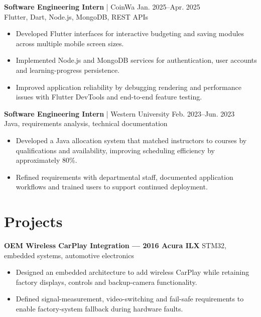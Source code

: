 \documentclass[letterpaper,10pt]{article}
\newcommand{\entry}[4]{
    \textbf{#1} \textnormal{| #2}
    \hfill {\small #3}\\[-1pt]
    {\small #4}
}
\begin{document}
\vspace{1pt}

\entry
{Software Engineering Intern}
{CoinWa}
{Jan. 2025--Apr. 2025}
{Flutter, Dart, Node.js, MongoDB, REST APIs}

\begin{itemize}
    \item Developed Flutter interfaces for interactive budgeting and saving modules across multiple mobile screen sizes.
    \item Implemented Node.js and MongoDB services for authentication, user accounts and learning-progress persistence.
    \item Improved application reliability by debugging rendering and performance issues with Flutter DevTools and end-to-end feature testing.
\end{itemize}

\vspace{1pt}

\entry
{Software Engineering Intern}
{Western University}
{Feb. 2023--Jun. 2023}
{Java, requirements analysis, technical documentation}

\begin{itemize}
    \item Developed a Java allocation system that matched instructors to courses by qualifications and availability, improving scheduling efficiency by approximately 80\%.
    \item Refined requirements with departmental staff, documented application workflows and trained users to support continued deployment.
\end{itemize}

\section{Projects}

\textbf{OEM Wireless CarPlay Integration --- 2016 Acura ILX}
\hfill
{\small STM32, embedded systems, automotive electronics}

\begin{itemize}
    \item Designed an embedded architecture to add wireless CarPlay while retaining factory displays, controls and backup-camera functionality.
    \item Defined signal-measurement, video-switching and fail-safe requirements to enable factory-system fallback during hardware faults.
\end{itemize}
\end{document}

